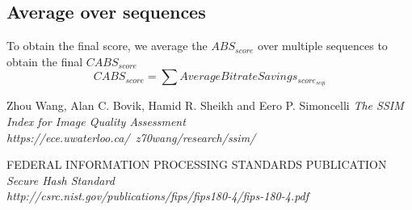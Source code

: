 \documentclass[12pt, conference, hidelinks, onecolumn]{IEEEtran}
\begin{document}
\subsection{Average over sequences}
To obtain the final score, we average the $ABS_{score}$ over multiple sequences to obtain the final $CABS_{score}$
\begin{equation}
CABS_{score} = \sum AverageBitrateSavings_{score_{seqi}}
\end{equation}


\begin{thebibliography}{9}
Zhou Wang,
Alan C. Bovik, 
Hamid R. Sheikh and Eero P. Simoncelli
\emph{The SSIM Index for Image Quality Assessment  \\https://ece.uwaterloo.ca/~z70wang/research/ssim/}

FEDERAL INFORMATION PROCESSING STANDARDS PUBLICATION
\emph{Secure Hash Standard \\http://csrc.nist.gov/publications/fips/fips180-4/fips-180-4.pdf}

\end{thebibliography}
\end{document}
